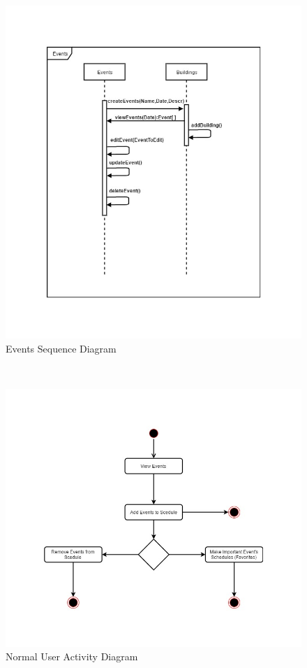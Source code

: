 \documentclass{article}
\begin{document}
    \mbox{}\\
    \bigskip
  
    
    \begin{figure}[h!]
        \includegraphics[width=\textwidth]{Events/Images/EventsSequence.jpg} \caption{Events Sequence Diagram}
    \end{figure}
  
    
    \mbox{}\\
    \bigskip
    
    
    \begin{figure}[h!]
        \includegraphics[width=\textwidth]{Events/Images/ActivityDiagramUser.jpg} \caption{Normal User Activity Diagram}
    \end{figure}
    
\end{document}
